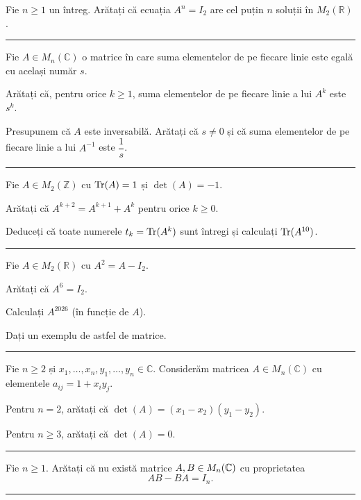 Fie $n\ge1$ un întreg. Arătați că ecuația $A^n=I_2$ are cel puțin $n$ soluții în $M_2(\mathbb{R})$.
\vspace{1mm}\hrule

Fie $A\in M_n(\mathbb{C})$ o matrice în care suma elementelor de pe fiecare linie este egală cu același număr $s$.
\begin{parti}
  \item Arătați că, pentru orice $k\ge1$, suma elementelor de pe fiecare linie a lui $A^k$ este $s^k$.
  \item Presupunem că $A$ este inversabilă. Arătați că $s\neq0$ și că suma elementelor de pe fiecare linie a lui $A^{-1}$ este $\dfrac1s$.
\end{parti}
\vspace{1mm}\hrule

Fie $A\in M_2(\mathbb{Z})$ cu $\operatorname{Tr}(A)=1$ și $\det(A)=-1$.
\begin{parti}
  \item Arătați că $A^{k+2}=A^{k+1}+A^{k}$ pentru orice $k\ge0$.
  \item Deduceți că toate numerele $t_k=\operatorname{Tr}(A^k)$ sunt întregi și calculați $\operatorname{Tr}(A^{10})$.
\end{parti}
\vspace{1mm}\hrule

Fie $A\in M_2(\mathbb{R})$ cu $A^2=A-I_2$.
\begin{parti}
  \item Arătați că $A^6=I_2$.
  \item Calculați $A^{2026}$ (în funcție de $A$).
  \item Dați un exemplu de astfel de matrice.
\end{parti}
\vspace{1mm}\hrule

Fie $n\ge2$ și $x_1,\dots,x_n,y_1,\dots,y_n\in\mathbb{C}$. Considerăm matricea $A\in M_n(\mathbb{C})$ cu elementele $a_{ij}=1+x_iy_j$.
\begin{parti}
  \item Pentru $n=2$, arătați că $\det(A)=(x_1-x_2)(y_1-y_2)$.
  \item Pentru $n\ge3$, arătați că $\det(A)=0$.
\end{parti}
\vspace{1mm}\hrule

Fie $n\ge1$. Arătați că nu există matrice $A,B\in M_n(\mathbb{C})$ cu proprietatea
\[ AB-BA=I_n . \]
\vspace{1mm}\hrule

